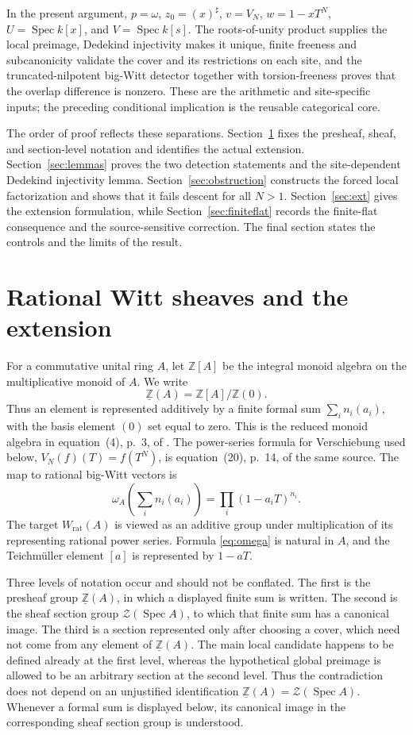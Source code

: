 \documentclass[11pt]{article}
\theoremstyle{definition}
\newcommand{\Spec}{\operatorname{Spec}}
\newcommand{\Wrat}{W_{\mathrm{rat}}}
\newcommand{\Zpre}{\underline{\mathbb Z}}
\newcommand{\Zsh}{\mathcal Z}
\newcommand{\sh}{\sharp}
\begin{document}
In the present argument, \(p=\omega\), \(z_0=(x)^\sh\),
\(v=V_N\), \(w=1-xT^N\), \(U=\Spec k[x]\), and
\(V=\Spec k[s]\).  The roots-of-unity product supplies the local
preimage, Dedekind injectivity makes it unique, finite freeness and
subcanonicity validate the cover and its restrictions on each site, and
the truncated-nilpotent big-Witt detector together with torsion-freeness
proves that the overlap difference is nonzero.  These are the arithmetic
and site-specific inputs; the preceding conditional implication is the
reusable categorical core.

The order of proof reflects these separations.  Section~\ref{sec:objects}
fixes the presheaf, sheaf, and section-level notation and identifies the
actual extension.  Section~\ref{sec:lemmas} proves the two detection
statements and the site-dependent Dedekind injectivity lemma.
Section~\ref{sec:obstruction} constructs the forced local factorization and
shows that it fails descent for all \(N>1\).
Section~\ref{sec:ext} gives the extension formulation, while
Section~\ref{sec:finiteflat} records the finite-flat consequence and the
source-sensitive correction.  The final section states the controls and
the limits of the result.

\section{Rational Witt sheaves and the extension}\label{sec:objects}

For a commutative unital ring \(A\), let \(\mathbb Z[A]\) be the integral
monoid algebra on the multiplicative monoid of \(A\).  We write
\[
 \Zpre(A)=\mathbb Z[A]/\mathbb Z(0).
\]
Thus an element is represented additively by a finite formal sum
\(\sum_i n_i(a_i)\), with the basis element \((0)\) set equal to zero.
This is the reduced monoid algebra in equation~(4), p.~3, of
\cite{Deninger2025Rational}.  The power-series formula for Verschiebung used
below, \(V_N(f)(T)=f(T^N)\), is equation~(20), p.~14, of the same source.
The map to rational big-Witt vectors is
\[
 \omega_A\!\left(\sum_i n_i(a_i)\right)
   =\prod_i(1-a_iT)^{n_i}.
 \tag{2.1}\label{eq:omega}
\]
The target \(\Wrat(A)\) is viewed as an additive group under multiplication
of its representing rational power series.  Formula
\eqref{eq:omega} is natural in \(A\), and the Teichm\"uller element
\([a]\) is represented by \(1-aT\).

Three levels of notation occur and should not be conflated.  The first is
the presheaf group \(\Zpre(A)\), in which a displayed finite sum is written.
The second is the sheaf section group
\(\Zsh(\Spec A)\), to which that finite sum has a canonical image.  The
third is a section represented only after choosing a cover, which need not
come from any element of \(\Zpre(A)\).  The main local candidate happens to
be defined already at the first level, whereas the hypothetical global
preimage is allowed to be an arbitrary section at the second level.  Thus
the contradiction does not depend on an unjustified identification
\(\Zpre(A)=\Zsh(\Spec A)\).
Whenever a formal sum is displayed below, its canonical image in the
corresponding sheaf section group is understood.
\end{document}
